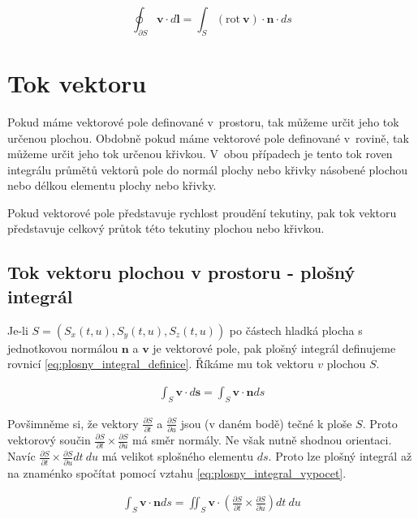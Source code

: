 \documentclass{book}
\newcommand{\vect}[1]{\boldsymbol{#1}}
\newcommand{\rot}{\mathrm{rot}}
\begin{document}
\begin{equation}
\label{eq:stokesova_veta}
\oint_{\partial S} \vect{v} \cdot d\vect{l} = \int_S (\rot \ \vect{v}) \cdot \vect{n} \cdot ds
\end{equation}


\section{Tok vektoru}

Pokud máme vektorové pole definované v~prostoru, tak můžeme určit jeho tok určenou plochou. Obdobně pokud máme vektorové pole definované
 v~rovině, tak můžeme určit jeho tok určenou křivkou. V~obou případech je tento tok roven integrálu průmětů vektorů pole do normál plochy nebo křivky násobené plochou nebo délkou elementu plochy nebo křivky.
 
Pokud vektorové pole představuje rychlost proudění tekutiny, pak tok vektoru představuje celkový průtok této tekutiny plochou nebo křivkou.

\subsection{Tok vektoru plochou v prostoru - plošný integrál}

Je-li \(S = \left(S_x(t, u), S_y(t, u), S_z(t, u)\right)\) po částech hladká plocha s jednotkovou normálou \(\vect{n}\) a \(\vect{v}\) je vektorové pole,
pak plošný integrál definujeme rovnicí \eqref{eq:plosny_integral_definice}. Říkáme mu tok vektoru \(v\) plochou \(S\).


\begin{equation}
\label{eq:plosny_integral_definice}
\begin{split}
\int_S \vect{v} \cdot d\vect{s} = \int_S \vect{v} \cdot \vect{n} ds
\end{split}
\end{equation}


Povšimněme si, že vektory \(\frac{\partial S}{\partial t}\) a \(\frac{\partial S}{\partial u}\) jsou (v daném bodě) tečné k ploše \(S\). Proto vektorový součin \(\frac{\partial S}{\partial t} \times \frac{\partial S}{\partial u}\) má směr normály. Ne však nutně shodnou orientaci. Navíc \(\frac{\partial S}{\partial t} \times \frac{\partial S}{\partial u} dt \ du\) má velikot splošného elementu \(ds\). Proto lze plošný integrál až na znaménko spočítat pomocí vztahu \eqref{eq:plosny_integral_vypocet}.

\begin{equation}
\label{eq:plosny_integral_vypocet}
\begin{split}
\int_S \vect{v} \cdot \vect{n} ds = \iint_S \vect{v} \cdot \left (\frac{\partial S}{\partial t} \times \frac{\partial S}{\partial u}\right) dt \ du
\end{split}
\end{equation}
\end{document}
